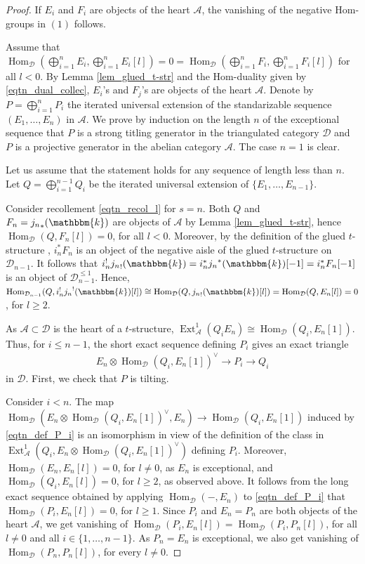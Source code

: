 \documentclass[12pt,a4paper]{amsart}
\newcommand{\aA}{{\mathcal{A}}}
\newcommand{\dD}{{\mathcal{D}}}
\newcommand{\kk}{\mathbbm{k}}
\newcommand{\tr}{{\mbox{$t$-struc}\-tu\-r}}
\newcommand{\Hom}{\mathop{\textrm{Hom}}\nolimits}
\newcommand{\Ext}{\mathop{\operatorname{Ext}}\nolimits}
\theoremstyle{definition}
\begin{document}
\begin{proof}
	If $E_i$ and $F_i$ are objects of the heart $\aA$, the vanishing  of the negative Hom-groups in $(1)$ follows.
	
	Assume that $\Hom_{\dD}(\bigoplus_{i=1}^n E_i, \bigoplus_{i=1}^n E_i[l]) = 0 = \Hom_{\dD}(\bigoplus_{i=1}^n F_i, \bigoplus_{i=1}^n F_i[l])$ for all $l<0$. By Lemma \ref{lem_glued_t-str} and the 
	Hom-duality given by \eqref{eqtn_dual_collec}, $E_i$'s and $F_j$'s are objects of the heart $\aA$. Denote by $P = \bigoplus_{i=1}^nP_i$ the iterated universal extension of the standarizable sequence $(E_1,\ldots,E_n)$ in $\aA$. 
	We prove by induction on the length $n$ of the exceptional sequence that $P$ is a strong titling generator in the triangulated category $\dD$ and $P$ is a projective generator in the abelian category $\aA$. The case $n=1$ is clear.
	
	Let us assume that the statement holds for any sequence of length less than $n$. Let $Q = \bigoplus_{i=1}^{n-1} Q_i$ be the iterated universal extension of $\{E_1,\ldots, E_{n-1}\}$. %
	
	Consider recollement \eqref{eqtn_recol_l} for $s=n$. Both $Q$ and $F_n = {j_n}_*(\kk)$ are objects of $\aA$ by Lemma \ref{lem_glued_t-str}, hence $\Hom_{\dD}(Q, F_n[l]) =0$, for all $l<0$. Moreover, by the definition of the glued \tr e \cite{BBD}, $i_n^*F_n$ is an object of the negative aisle of the glued \tr e on $\dD_{n-1}$. It follows that $i_n^!{j_n}_!(\kk) = i_n^*{j_n}^*(\kk)[-1] = i_n^*F_n[-1]$ is an object of $\dD_{n-1}^{\leq 1}$. Hence, $\Hom_{\dD_{n-1}}(Q, i_n^!{j_n}^!(\kk)[l]) \cong \Hom_{\dD}(Q, {j_n}_!(\kk)[l]) = \Hom_{\dD}(Q, E_n[l])=0$, for $l\geq 2$.
	
	As $\aA\subset \dD$ is the heart of a \tr e, $\Ext^1_{\aA}(Q_i E_n) \cong \Hom_{\dD}(Q_i, E_n[1])$. 
	Thus, for $i\leq n-1$, the short exact sequence defining $P_{i}$ gives an exact triangle
	\begin{align}\label{eqtn_def_P_i}
	 E_n \otimes \Hom_{\dD}(Q_i, E_n[1])^{\vee} \to P_i \to Q_i 
	\end{align}
	in $\dD$. First, we check that $P $ is tilting.
	
	Consider $i<n$.
	The map $\Hom_{\dD}(E_n \otimes \Hom_{\dD}(Q_i, E_n[1])^\vee, E_n) \to \Hom_{\dD}(Q_i, E_n[1])$ induced by \eqref{eqtn_def_P_i} is an isomorphism in view of the definition of the class in $\Ext_{\aA}^1(Q_i, E_n\otimes \Hom_{\dD}(Q_i, E_n[1])^{\vee})$ defining $P_i$. Moreover, $\Hom_{\dD}(E_n, E_n[l]) =0$,  for $l\neq 0$, as $E_n$ is exceptional, and $\Hom_{\dD}(Q_i, E_n[l]) = 0$, for $l\geq 2$, as observed above. It follows from the long exact sequence obtained by applying $\Hom_{\dD}(-, E_n)$ to \eqref{eqtn_def_P_i} that $\Hom_{\dD}(P_i, E_n[l])=0$, for $l\geq 1$. Since $P_i$ and $E_n=P_n$ are both objects of the heart $\aA$, we get vanishing of $\Hom_{\dD}(P_i, E_n[l]) = \Hom_{\dD}(P_i, P_n[l])$, for all $l \neq 0$ and all $i\in \{1, \ldots,n-1\}$. As $P_n=E_n$ is exceptional, we also get vanishing of  $\Hom_{\dD}(P_n, P_n[l])$, for every $l\neq 0$.
		

\end{proof}
\end{document}
